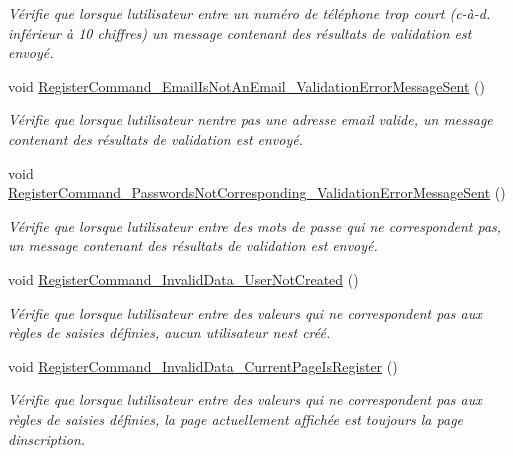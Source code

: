 \begin{DoxyCompactItemize}
\begin{DoxyCompactList}\small\item\em Vérifie que lorsque l\textquotesingle{}utilisateur entre un numéro de téléphone trop court (c-\/à-\/d. inférieur à 10 chiffres) un message contenant des résultats de validation est envoyé. \end{DoxyCompactList}\item 
void \hyperlink{class_boxes_1_1_tests_1_1_register_view_model_tests_a06981702e2516f36fed3f32097ce4a40}{Register\+Command\+\_\+\+Email\+Is\+Not\+An\+Email\+\_\+\+Validation\+Error\+Message\+Sent} ()
\begin{DoxyCompactList}\small\item\em Vérifie que lorsque l\textquotesingle{}utilisateur n\textquotesingle{}entre pas une adresse email valide, un message contenant des résultats de validation est envoyé. \end{DoxyCompactList}\item 
void \hyperlink{class_boxes_1_1_tests_1_1_register_view_model_tests_afbe00afb0ad17ce977d8c44136b99606}{Register\+Command\+\_\+\+Passwords\+Not\+Corresponding\+\_\+\+Validation\+Error\+Message\+Sent} ()
\begin{DoxyCompactList}\small\item\em Vérifie que lorsque l\textquotesingle{}utilisateur entre des mots de passe qui ne correspondent pas, un message contenant des résultats de validation est envoyé. \end{DoxyCompactList}\item 
void \hyperlink{class_boxes_1_1_tests_1_1_register_view_model_tests_a81c4e95045d61ecea88a7d82c2f3dbbc}{Register\+Command\+\_\+\+Invalid\+Data\+\_\+\+User\+Not\+Created} ()
\begin{DoxyCompactList}\small\item\em Vérifie que lorsque l\textquotesingle{}utilisateur entre des valeurs qui ne correspondent pas aux règles de saisies définies, aucun utilisateur n\textquotesingle{}est créé. \end{DoxyCompactList}\item 
void \hyperlink{class_boxes_1_1_tests_1_1_register_view_model_tests_a035b1f49da9e911a4edbc0497034ab97}{Register\+Command\+\_\+\+Invalid\+Data\+\_\+\+Current\+Page\+Is\+Register} ()
\begin{DoxyCompactList}\small\item\em Vérifie que lorsque l\textquotesingle{}utilisateur entre des valeurs qui ne correspondent pas aux règles de saisies définies, la page actuellement affichée est toujours la page d\textquotesingle{}inscription. \end{DoxyCompactList}\item 

\end{DoxyCompactItemize}
